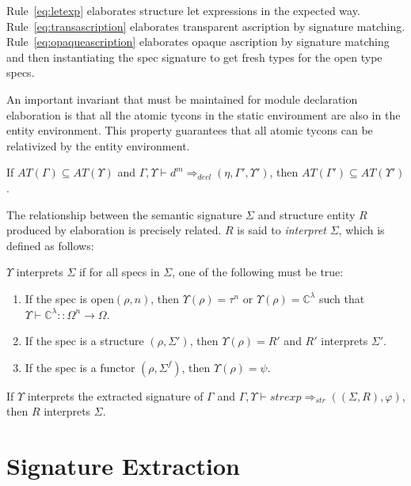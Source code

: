 Rule~\ref{eq:letexp} elaborates structure let expressions in the expected way. Rule~\ref{eq:transascription} elaborates transparent ascription by signature matching. Rule~\ref{eq:opaqueascription} elaborates opaque ascription by signature matching and then instantiating the spec signature to get fresh types for the open type specs. 


An important invariant that must be maintained for module declaration elaboration is that all the atomic tycons in the static environment are also in the entity environment. This property guarantees that all atomic tycons can be relativized by the entity environment. 

\begin{lemma}
If $AT(\Gamma) \subseteq AT(\Upsilon)$ and $\Gamma,\Upsilon\vdash d^m \Rightarrow_{decl} (\eta,\Gamma',\Upsilon')$, then $AT(\Gamma') \subseteq AT(\Upsilon')$. 
\end{lemma}

The relationship between the semantic signature $\Sigma$ and structure
entity $R$ produced by elaboration is precisely related. $R$ is said
to \emph{interpret} $\Sigma$, which is defined as follows: 

\begin{definition}
$\Upsilon$ interprets $\Sigma$ if for all specs in $\Sigma$, one of the
following must be true:
\begin{enumerate}
\item If the spec is open$(\rho,n)$, then $\Upsilon(\rho)=\tau^n$
  or $\Upsilon(\rho)=\mathbb{C}^\lambda$ such that $\Upsilon\vdash
  \mathbb{C}^\lambda :: \Omega^n \to \Omega$. 
\item If the spec is a structure $(\rho,\Sigma')$, then $\Upsilon(\rho)=R'$ and $R'$ interprets $\Sigma'$. 
\item If the spec is a functor $(\rho,\Sigma^f)$, then 
  $\Upsilon(\rho)=\psi$. 
\end{enumerate}
\end{definition}

\begin{lemma}
If $\Upsilon$ interprets the extracted signature of $\Gamma$ and 
$\Gamma,\Upsilon\vdash strexp \Rightarrow_{str} ((\Sigma, R),
\varphi)$, then $R$ interprets $\Sigma$.
\end{lemma}

\section{Signature Extraction}\label{sec:sigextract}

